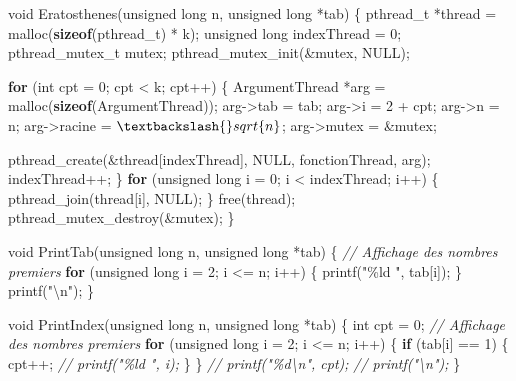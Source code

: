 \documentclass[
    ]{article}
\newenvironment{Shaded}{}{}
\newcommand{\CommentTok}[1]{\textcolor[rgb]{0.38,0.63,0.69}{\textit{#1}}}
\newcommand{\ControlFlowTok}[1]{\textcolor[rgb]{0.00,0.44,0.13}{\textbf{#1}}}
\newcommand{\DataTypeTok}[1]{\textcolor[rgb]{0.56,0.13,0.00}{#1}}
\newcommand{\DecValTok}[1]{\textcolor[rgb]{0.25,0.63,0.44}{#1}}
\newcommand{\KeywordTok}[1]{\textcolor[rgb]{0.00,0.44,0.13}{\textbf{#1}}}
\newcommand{\NormalTok}[1]{#1}
\newcommand{\SpecialCharTok}[1]{\textcolor[rgb]{0.25,0.44,0.63}{#1}}
\newcommand{\StringTok}[1]{\textcolor[rgb]{0.25,0.44,0.63}{#1}}
\begin{document}
\begin{Shaded}
\begin{Highlighting}[]
\DataTypeTok{void}\NormalTok{ Eratosthenes(}\DataTypeTok{unsigned} \DataTypeTok{long}\NormalTok{ n, }\DataTypeTok{unsigned} \DataTypeTok{long}\NormalTok{ *tab)}
\NormalTok{\{}
\NormalTok{    pthread\_t *thread = malloc(}\KeywordTok{sizeof}\NormalTok{(pthread\_t) * k);}
    \DataTypeTok{unsigned} \DataTypeTok{long}\NormalTok{ indexThread = }\DecValTok{0}\NormalTok{;}
\NormalTok{    pthread\_mutex\_t mutex;}
\NormalTok{    pthread\_mutex\_init(\&mutex, NULL);}
    
    \ControlFlowTok{for}\NormalTok{ (}\DataTypeTok{int}\NormalTok{ cpt = }\DecValTok{0}\NormalTok{; cpt \textless{} k; cpt++)}
\NormalTok{    \{}
\NormalTok{        ArgumentThread *arg = malloc(}\KeywordTok{sizeof}\NormalTok{(ArgumentThread));}
\NormalTok{        arg{-}\textgreater{}tab = tab;}
\NormalTok{        arg{-}\textgreater{}i = }\DecValTok{2}\NormalTok{ + cpt;}
\NormalTok{        arg{-}\textgreater{}n = n;}
\NormalTok{        arg{-}\textgreater{}racine = $\textbackslash{}sqrt\{n\}$;}
\NormalTok{        arg{-}\textgreater{}mutex = \&mutex;}
        
\NormalTok{        pthread\_create(\&thread[indexThread], NULL, fonctionThread, arg);}
\NormalTok{        indexThread++;}
\NormalTok{    \}}
    \ControlFlowTok{for}\NormalTok{ (}\DataTypeTok{unsigned} \DataTypeTok{long}\NormalTok{ i = }\DecValTok{0}\NormalTok{; i \textless{} indexThread; i++)}
\NormalTok{    \{}
\NormalTok{        pthread\_join(thread[i], NULL);}
\NormalTok{    \}}
\NormalTok{    free(thread);}
\NormalTok{    pthread\_mutex\_destroy(\&mutex);}
\NormalTok{\}}

\DataTypeTok{void}\NormalTok{ PrintTab(}\DataTypeTok{unsigned} \DataTypeTok{long}\NormalTok{ n, }\DataTypeTok{unsigned} \DataTypeTok{long}\NormalTok{ *tab)}
\NormalTok{\{}
    \CommentTok{// Affichage des nombres premiers}
    \ControlFlowTok{for}\NormalTok{ (}\DataTypeTok{unsigned} \DataTypeTok{long}\NormalTok{ i = }\DecValTok{2}\NormalTok{; i \textless{}= n; i++)}
\NormalTok{    \{}
\NormalTok{        printf(}\StringTok{"\%ld "}\NormalTok{, tab[i]);}
\NormalTok{    \}}
\NormalTok{    printf(}\StringTok{"}\SpecialCharTok{\textbackslash{}n}\StringTok{"}\NormalTok{);}
\NormalTok{\}}

\DataTypeTok{void}\NormalTok{ PrintIndex(}\DataTypeTok{unsigned} \DataTypeTok{long}\NormalTok{ n, }\DataTypeTok{unsigned} \DataTypeTok{long}\NormalTok{ *tab)}
\NormalTok{\{}
    \DataTypeTok{int}\NormalTok{ cpt = }\DecValTok{0}\NormalTok{;}
    \CommentTok{// Affichage des nombres premiers}
    \ControlFlowTok{for}\NormalTok{ (}\DataTypeTok{unsigned} \DataTypeTok{long}\NormalTok{ i = }\DecValTok{2}\NormalTok{; i \textless{}= n; i++)}
\NormalTok{    \{}
        \ControlFlowTok{if}\NormalTok{ (tab[i] == }\DecValTok{1}\NormalTok{)}
\NormalTok{        \{}
\NormalTok{            cpt++;}
            \CommentTok{// printf("\%ld ", i);}
\NormalTok{        \}}
\NormalTok{    \}}
    \CommentTok{// printf("\%d\textbackslash{}n", cpt);}
    \CommentTok{// printf("\textbackslash{}n");}
\NormalTok{\}}


\end{Highlighting}
\end{Shaded}
\end{document}
